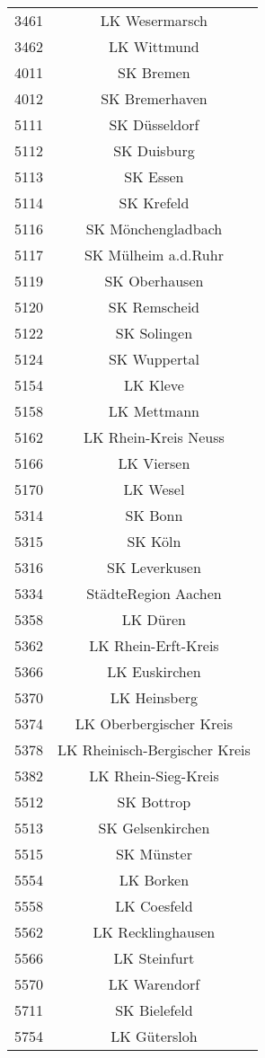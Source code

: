 \begin{tabular}{c c}
    3461&LK Wesermarsch\\ 
    3462&LK Wittmund\\ 
    4011&SK Bremen\\ 
    4012&SK Bremerhaven\\ 
    5111&SK Düsseldorf\\ 
    5112&SK Duisburg\\ 
    5113&SK Essen\\ 
    5114&SK Krefeld\\ 
    5116&SK Mönchengladbach\\ 
    5117&SK Mülheim a.d.Ruhr\\ 
    5119&SK Oberhausen\\ 
    5120&SK Remscheid\\ 
    5122&SK Solingen\\ 
    5124&SK Wuppertal\\ 
    5154&LK Kleve\\ 
    5158&LK Mettmann\\ 
    5162&LK Rhein-Kreis Neuss\\ 
    5166&LK Viersen\\ 
    5170&LK Wesel\\ 
    5314&SK Bonn\\ 
    5315&SK Köln\\ 
    5316&SK Leverkusen\\ 
    5334&StädteRegion Aachen\\ 
    5358&LK Düren\\ 
    5362&LK Rhein-Erft-Kreis\\ 
    5366&LK Euskirchen\\ 
    5370&LK Heinsberg\\ 
    5374&LK Oberbergischer Kreis\\ 
    5378&LK Rheinisch-Bergischer Kreis\\ 
    5382&LK Rhein-Sieg-Kreis\\ 
    5512&SK Bottrop\\ 
    5513&SK Gelsenkirchen\\ 
    5515&SK Münster\\ 
    5554&LK Borken\\ 
    5558&LK Coesfeld\\ 
    5562&LK Recklinghausen\\ 
    5566&LK Steinfurt\\ 
    5570&LK Warendorf\\ 
    5711&SK Bielefeld\\ 
    5754&LK Gütersloh\\ 

\end{tabular}
